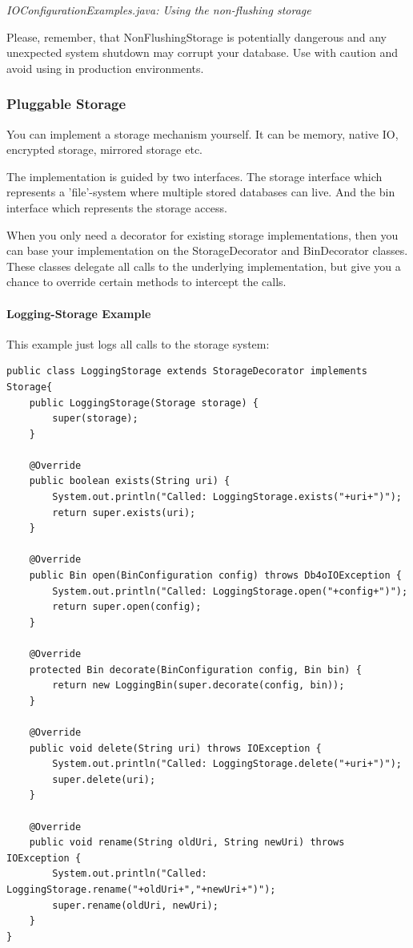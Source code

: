 {\small\itshape IOConfigurationExamples.java: Using the non-flushing storage\par}
\medskip

Please, remember, that NonFlushingStorage is potentially dangerous and any unexpected system shutdown may corrupt your database. Use with caution and avoid using in production environments.

\subsubsection{Pluggable Storage}
\label{ref:configuration-file-storage-pluggable-storage}

You can implement a storage mechanism yourself. It can be memory, native IO, encrypted storage, mirrored storage etc.

The implementation is guided by two interfaces. The storage interface which represents a 'file'-system where multiple stored databases can live. And the bin interface which represents the storage access.

When you only need a decorator for existing storage implementations, then you can base your implementation on the StorageDecorator and BinDecorator classes. These classes delegate all calls to the underlying implementation, but give you a chance to override certain methods to intercept the calls.

\paragraph*{Logging-Storage Example}

This example just logs all calls to the storage system:

\begin{lstlisting}
public class LoggingStorage extends StorageDecorator implements Storage{
    public LoggingStorage(Storage storage) {
        super(storage);
    }

    @Override
    public boolean exists(String uri) {
        System.out.println("Called: LoggingStorage.exists("+uri+")");
        return super.exists(uri);
    }

    @Override
    public Bin open(BinConfiguration config) throws Db4oIOException {
        System.out.println("Called: LoggingStorage.open("+config+")");
        return super.open(config);
    }

    @Override
    protected Bin decorate(BinConfiguration config, Bin bin) {
        return new LoggingBin(super.decorate(config, bin));
    }

    @Override
    public void delete(String uri) throws IOException {
        System.out.println("Called: LoggingStorage.delete("+uri+")");
        super.delete(uri);
    }

    @Override
    public void rename(String oldUri, String newUri) throws IOException {
        System.out.println("Called: LoggingStorage.rename("+oldUri+","+newUri+")");
        super.rename(oldUri, newUri);
    }
}
\end{lstlisting}

